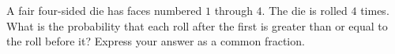 A fair four-sided die has faces numbered $1$ through $4$. The die is rolled $4$ times. What is the probability that each roll after the first is greater than or equal to the roll before it? Express your answer as a common fraction.

